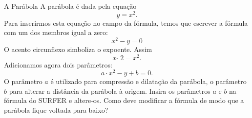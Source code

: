 \begin{surferPage}{A Parábola}
A par\'abola \'e dada pela equa\c c\~ao  \[y=x^2.\]
Para inserirmos esta equa\c c\~ao no campo da f\'ormula, temos que escrever a f\'ormula com um dos membros igual a zero:
\[x^2-y=0\]
O acento circunflexo simboliza o expoente. Assim 
\[ x  \,\hat{\ } \, 2 =x^2.\]
Adicionamos agora dois par\^ametros:
\[a \cdot x^2-y+b=0.\]
O par\^ametro $a$ \'e utilizado para compress\~ao e dilata\c c\~ao da par\'abola, o par\^ametro $b$ para alterar a dist\^ancia da par\'abola \`a origem.
\newline
Insira os par\^ametros $a$ e $b$ na f\'ormula do SURFER e altere-os. Como deve modificar a f\'ormula de modo que a par\'abola fique voltada para baixo?
\end{surferPage}
